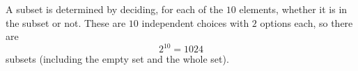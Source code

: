 A subset is determined by deciding, for each of the $10$ elements, whether it is in the subset or not. These are $10$ independent choices with $2$ options each, so there are
\[2^{10}=\boxed{1024}\]
subsets (including the empty set and the whole set).

